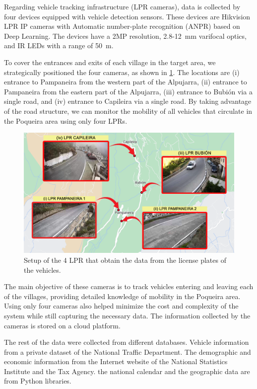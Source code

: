 Regarding vehicle tracking infrastructure (LPR cameras), data is collected by four devices equipped with vehicle detection sensors. These devices are Hikvision LPR IP cameras with Automatic number-plate recognition (ANPR) based on Deep Learning. The devices have a 2MP resolution, 2.8-12 mm varifocal optics, and IR LEDs with a range of 50 m.

To cover the entrances and exits of each village in the target area, we strategically positioned the four cameras, as shown in \cref{fig:map}. The locations are (i) entrance to Pampaneira from the western part of the Alpujarra, (ii) entrance to Pampaneira from the eastern part of the Alpujarra, (iii) entrance to Bubión via a single road, and (iv) entrance to Capileira via a single road. By taking advantage of the road structure, we can monitor the mobility of all vehicles that circulate in the Poqueira area using only four LPRs.

\begin{figure}
\begin{center}
	\includegraphics[width = \linewidth]{Images/setup_map.png}
\end{center}
	\caption{\label{fig:map} Setup of the 4 LPR that obtain the data from the license plates of the vehicles.}
\end{figure}

The main objective of these cameras is to track vehicles entering and leaving each of the villages, providing detailed knowledge of mobility in the Poqueira area. Using only four cameras also helped minimize the cost and complexity of the system while still capturing the necessary data. The information collected by the cameras is stored on a cloud platform.

The rest of the data were collected from different databases. Vehicle information from a private dataset of the National Traffic Department. The demographic and economic information from the Internet website of the National Statistics Institute and the Tax Agency. the national calendar and the geographic data are from Python libraries.  


